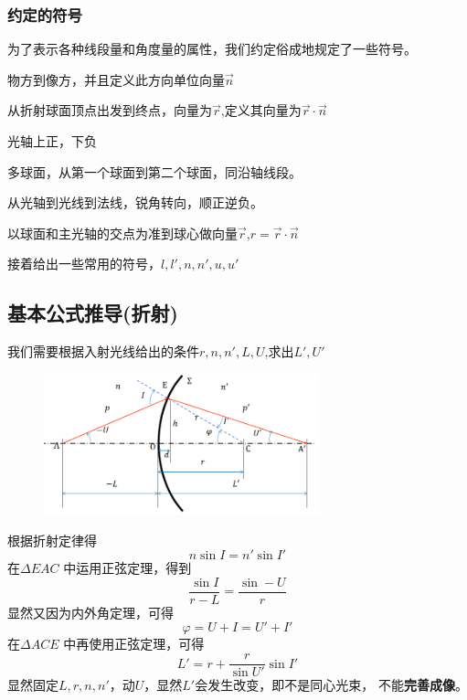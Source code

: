 \subsubsection{约定的符号}
为了表示各种线段量和角度量的属性，我们约定俗成地规定了一些符号。
\begin{description}[leftmargin=1.7cm,style=nextline,nosep]%
    \item[传播方向] 物方到像方，并且定义此方向单位向量$\vec{n}$
    \item[沿轴线段] 从折射球面顶点出发到终点，向量为$\vec{r}$,定义其向量为$\vec{r}\cdot \vec{n}$
    \item[垂轴线段] 光轴上正，下负
    \item[间隔$d$] 多球面，从第一个球面到第二个球面，同沿轴线段。
    \item[角度] 从光轴到光线到法线，锐角转向，顺正逆负。
    \item[球面半径] 以球面和主光轴的交点为准到球心做向量$\vec{r}$,$r=\vec{r}\cdot \vec{n}$
\end{description}
接着给出一些常用的符号，$l,l',n,n',u,u'$
\subsection{基本公式推导(折射)}
我们需要根据入射光线给出的条件$r,n,n',L,U$,求出$L',U'$
\begin{figure}[H]
    \centering
    \includegraphics[width=8cm]{img/1.1.png}
\end{figure}
根据折射定律得
\begin{equation}
    n \sin I =n' \sin I '\tag{1.2.1.a}
\end{equation}
在$\Delta EAC$ 中运用正弦定理，得到
\begin{equation}
    \frac{\sin I }{r-L}=\frac{\sin -U}{r}\tag{1.2.2.a}
\end{equation}
显然又因为内外角定理，可得
\begin{equation}
    \varphi=U+I=U'+I' \tag{1.2.3.a}
\end{equation}
在$\Delta ACE$ 中再使用正弦定理，可得
\begin{equation}
    L'=r+\frac{r}{\sin U'} \sin I' \tag{1.2.4.a}
\end{equation}
显然固定$L,r,n,n'$，动$U$，显然$L'$会发生改变，即不是同心光束，
不能\textbf{完善成像}。
